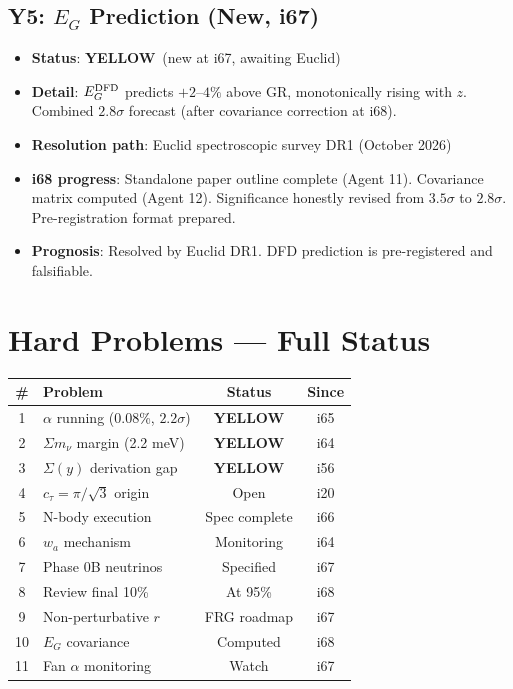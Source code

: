\documentclass[11pt,a4paper]{article}
\newcommand{\YELLOW}{\textcolor{dfdyellow}{\textbf{YELLOW}}}
\begin{document}
\subsection{Y5: $E_G$ Prediction (New, i67)}
\begin{itemize}[nosep]
\item \textbf{Status}: \YELLOW\ (new at i67, awaiting Euclid)
\item \textbf{Detail}: $E_G^{\rm DFD}$ predicts $+2$--$4\%$ above GR, monotonically rising with $z$. Combined $2.8\sigma$ forecast (after covariance correction at i68).
\item \textbf{Resolution path}: Euclid spectroscopic survey DR1 (October 2026)
\item \textbf{i68 progress}: Standalone paper outline complete (Agent 11). Covariance matrix computed (Agent 12). Significance honestly revised from $3.5\sigma$ to $2.8\sigma$. Pre-registration format prepared.
\item \textbf{Prognosis}: Resolved by Euclid DR1. DFD prediction is pre-registered and falsifiable.
\end{itemize}


\section{Hard Problems --- Full Status}

\begin{center}
\begin{longtable}{clcc}
\toprule
\textbf{\#} & \textbf{Problem} & \textbf{Status} & \textbf{Since} \\
\midrule
1 & $\alpha$ running (0.08\%, $2.2\sigma$) & \YELLOW & i65 \\
2 & $\Sigma m_\nu$ margin (2.2 meV) & \YELLOW & i64 \\
3 & $\Sigma(y)$ derivation gap & \YELLOW & i56 \\
4 & $c_\tau = \pi/\sqrt{3}$ origin & Open & i20 \\
5 & N-body execution & Spec complete & i66 \\
6 & $w_a$ mechanism & Monitoring & i64 \\
7 & Phase 0B neutrinos & Specified & i67 \\
8 & Review final 10\% & At 95\% & i68 \\
9 & Non-perturbative $r$ & FRG roadmap & i67 \\
10 & $E_G$ covariance & Computed & i68 \\
11 & Fan $\alpha$ monitoring & Watch & i67 \\
\bottomrule
\end{longtable}
\end{center}
\end{document}
